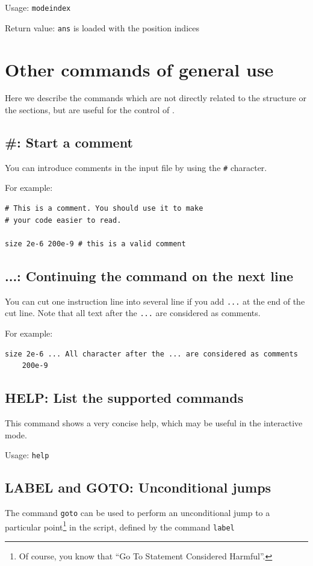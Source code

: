 Usage:  \lstinline!modeindex!
    
Return value: \lstinline!ans! is loaded with the position indices

\section{Other commands of general use}
Here we describe the commands which are not directly related to the structure or the sections, but are useful for the control of \afmm .

\subsection{\#: Start a comment}
You can introduce comments in the input file by using the \lstinline!#! character.

For example:
\begin{lstlisting}
# This is a comment. You should use it to make 
# your code easier to read.

size 2e-6 200e-9 # this is a valid comment
\end{lstlisting}

\subsection{...: Continuing the command on the next line}
You can cut one instruction line into several line if you add \lstinline!...! at the end of the cut line. Note that all text after the \lstinline!...! are considered as comments.

For example:
\begin{lstlisting}
size 2e-6 ... All character after the ... are considered as comments
	200e-9 
\end{lstlisting}

\subsection{HELP: List the supported commands}
    This command shows a very concise help, which may be useful in the 
    interactive mode.

    Usage: \lstinline!help!
    
\subsection{LABEL and GOTO: Unconditional jumps}
    The command  \lstinline!goto! can be used to perform an unconditional jump to a particular point\footnote{Of course, you know that ``Go To Statement Considered Harmful''\cite{dijkstra1968letters}.} in the script, defined by the command \lstinline!label!
    
